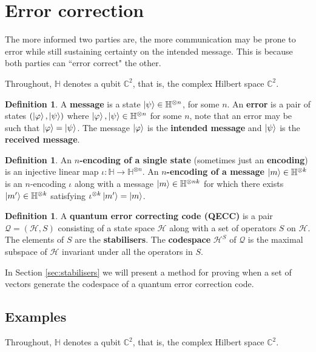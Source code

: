 \documentclass[12pt]{article}
\theoremstyle{plain}
\theoremstyle{definition}
\newtheorem{defn}[thm]{Definition} %
\newcommand{\bb}[1]{\mathbb{#1}}
\newcommand{\call}[1]{\mathcal{#1}}
\newcommand{\lto}{\longrightarrow}
\begin{document}
	\section{Error correction}
	The more informed two parties are, the more communication may be prone to error while still sustaining certainty on the intended message. This is because both parties can ``error correct" the other.
	
	Throughout, $\bb{H}$ denotes a qubit $\bb{C}^2$, that is, the complex Hilbert space $\bb{C}^2$.
	
	\begin{defn}
		A \textbf{message} is a state $\ket{\psi} \in \bb{H}^{\otimes n}$, for some $n$. An \textbf{error} is a pair of states $(\ket{\varphi},\ket{\psi})$ where $\ket{\varphi},\ket{\psi} \in \bb{H}^{\otimes n}$ for some $n$, note that an error may be such that $\ket{\varphi} = \ket{\psi}$.  The message $\ket{\varphi}$ is the \textbf{intended message} and $\ket{\psi}$ is the \textbf{received message}. 
	\end{defn}
	\begin{defn}
		An \textbf{$n$-encoding of a single state} (sometimes just an \textbf{encoding}) is an injective linear map $\iota: \bb{H} \lto \bb{H}^{\otimes n}$. An \textbf{$n$-encoding of a message} $\ket{m} \in \bb{H}^{\otimes k}$ is an $n$-encoding $\iota$ along with a message $\ket{m} \in \bb{H}^{\otimes nk}$ for which there exists $\ket{m'} \in \bb{H}^{\otimes k}$ satisfying $\iota^{\otimes k}\ket{m'} = \ket{m}$.
	\end{defn}

\begin{defn}\label{def:QECC}
	A \textbf{quantum error correcting code (QECC)} is a pair $\call{Q} = (\call{H}, S)$ consisting of a state space $\call{H}$ along with a set of operators $S$ on $\call{H}$. The elements of $S$ are the \textbf{stabilisers}. The \textbf{codespace} $\call{H}^S$ of $\call{Q}$ is the maximal subspace of $\call{H}$ invariant under all the operators in $S$.
	\end{defn}

In Section \ref{sec:stabilisers} we will present a method for proving when a set of vectors generate the codespace of a quantum error correction code.

\subsection{Examples}\label{sec:examples}
Throughout, $\bb{H}$ denotes a qubit $\bb{C}^2$, that is, the complex Hilbert space $\bb{C}^2$.
\end{document}
